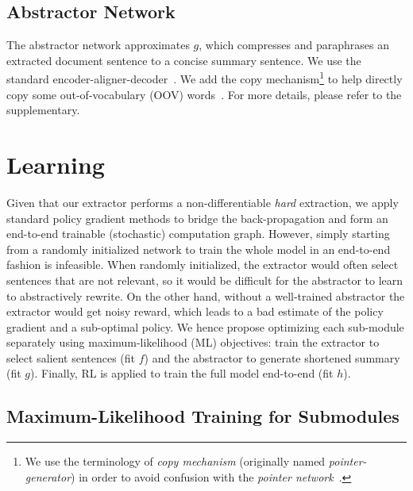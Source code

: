 \documentclass[11pt,a4paper]{article}
\begin{document}
\subsection{Abstractor Network}
\label{sec:abs}
The abstractor network approximates $g$, 
which compresses and paraphrases an extracted document sentence to a concise summary sentence.
We use the standard encoder-aligner-decoder~\cite{bahdanau+al-2014-nmt,luong-pham-manning:2015:EMNLP}. We add the copy mechanism\footnote{We use the terminology of \textit{copy mechanism} (originally named 
\textit{pointer-generator}) in order to avoid confusion with the \textit{pointer network}~\cite{NIPS2015_5866:pointer_networks}.}
to help directly copy some out-of-vocabulary (OOV) words~\cite{get_to_the_point}.
For more details, please refer to the supplementary.

 

\section{Learning}
Given that our extractor performs a non-differentiable \emph{hard} extraction, 
we apply standard policy gradient methods to bridge the back-propagation and form an end-to-end trainable (stochastic) computation graph.
However, simply starting from a randomly initialized network to train the whole model in an end-to-end fashion is infeasible. 
When randomly initialized, the extractor would often select sentences that are not relevant,
so it would be difficult for the abstractor to learn to abstractively rewrite.
On the other hand, without a well-trained abstractor the extractor would get noisy reward, which leads to a bad estimate of the policy gradient and a sub-optimal policy.
We hence propose optimizing each sub-module separately using maximum-likelihood (ML) objectives: 
train the extractor to select salient sentences (fit $f$) and the abstractor to generate shortened summary (fit $g$).
Finally, RL is applied to train the full model end-to-end (fit $h$).

\subsection{Maximum-Likelihood Training for Submodules}
\end{document}
